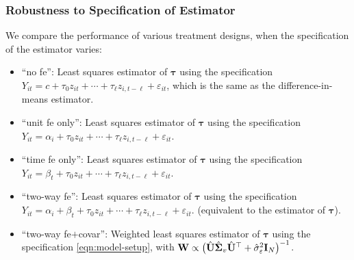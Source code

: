\subsubsection{Robustness to Specification of Estimator}\label{subsubsec:robustness-to-specification}

We compare the performance of various treatment designs, when the specification of the estimator varies:
%
\begin{itemize}
    \item ``no fe'': Least squares estimator of $\bm{\tau}$ using the specification $Y_{it} = c + \tau_0 z_{it} + \cdots + \tau_{\ell} z_{i,t-\ell} + \varepsilon_{it}$, which is the same as the difference-in-means estimator. 
    \item ``unit fe only'': Least squares estimator of $\bm{\tau}$ using the specification $Y_{it} = \alpha_i + \tau_0 z_{it} + \cdots + \tau_{\ell} z_{i,t-\ell} + \varepsilon_{it}$. 
    \item ``time fe only'': Least squares estimator of $\bm{\tau}$ using the specification $Y_{it} = \beta_t + \tau_0 z_{it} + \cdots + \tau_{\ell} z_{i,t-\ell} + \varepsilon_{it}$. 
    \item ``two-way fe'': Least squares estimator of  $\bm{\tau}$ using the specification $Y_{it} = \alpha_i + \beta_t +  \tau_0 z_{it} + \cdots + \tau_{\ell} z_{i,t-\ell} + \varepsilon_{it}$. (equivalent to the \within estimator of $\bm{\tau}$).
    \item ``two-way fe$+$covar'': Weighted least squares estimator of $\bm{\tau}$ using the specification \eqref{eqn:model-setup}, with $\mathbf{W} \propto \big(\hat{\mathbf{U}} \hat{\mathbf{\Sigma}}_v \hat{\mathbf{U}}^\top + \hat\sigma_\varepsilon^2 \mathbf{I}_N \big)^{-1}$.
\end{itemize}

